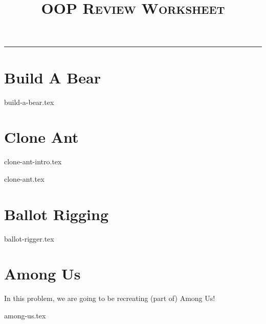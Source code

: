 \documentclass{exam}
\title{\textsc{OOP Review Worksheet}}
\begin{document}
\maketitle
\rule{\textwidth}{0.15em}
\fontsize{12}{15}\selectfont

\section{Build A Bear}
\begin{questions}
{build-a-bear.tex}
\end{questions}

\newpage
\section{Clone Ant}

{clone-ant-intro.tex}

\begin{questions}
{clone-ant.tex}
\end{questions}

\newpage
\section{Ballot Rigging}
\begin{questions}
{ballot-rigger.tex}
\end{questions}

\newpage
\section{Among Us}
In this problem, we are going to be recreating (part of) Among Us!

\begin{questions}
{among-us.tex}
\end{questions}
\end{document}
